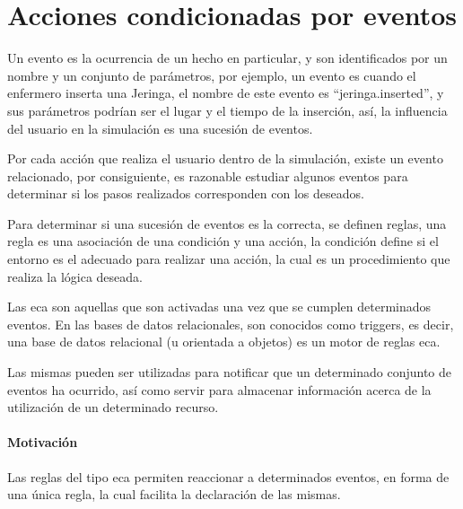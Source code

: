 


\section{Acciones condicionadas por eventos}
\label{sec:eca}


Un evento es la ocurrencia de un hecho en particular, y son identificados por un
nombre y un conjunto de parámetros, por ejemplo, un evento es cuando el
enfermero inserta una Jeringa, el nombre de este evento es
\enquote{jeringa.inserted}, y sus parámetros podrían ser el lugar y el tiempo de
la inserción, así, la influencia del usuario en la simulación es una sucesión de
eventos.

Por cada acción que realiza el usuario dentro de la simulación, existe un evento
relacionado, por consiguiente, es razonable estudiar algunos eventos para
determinar si los pasos realizados corresponden con los deseados. 

Para determinar si una sucesión de eventos es la correcta, se definen reglas,
una regla es una asociación de una condición y una acción, la condición define
si el entorno es el adecuado para realizar una acción, la cual es un
procedimiento que realiza la lógica deseada.

Las \gls{eca} son aquellas que son activadas una vez que se cumplen determinados
eventos\cite{bailey2004event}. En las bases de datos relacionales, son conocidos
como triggers, es decir, una base de datos relacional (u orientada a objetos) es
un motor de reglas \gls{eca}\cite{bailey2004event,behrends2006combining}.

Las mismas pueden ser utilizadas para notificar que un determinado conjunto de
eventos ha ocurrido\cite{bailey2004event}, así como servir para almacenar
información acerca de la utilización de un determinado recurso.


\paragraph{Motivación}

Las reglas del tipo \gls{eca} permiten reaccionar a determinados eventos, en
forma de una única regla, la cual facilita la declaración de las
mismas\cite{bailey2004event}.

